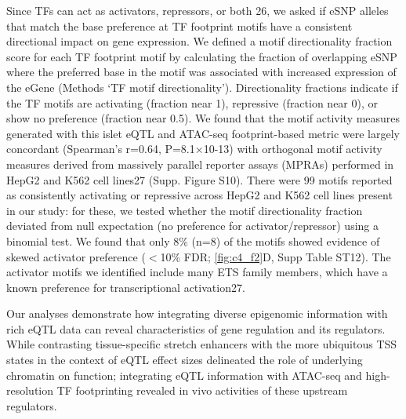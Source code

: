 Since TFs can act as activators, repressors, or both 26, we asked if eSNP alleles that match the base preference at TF footprint motifs have a consistent directional impact on gene expression. We defined a motif directionality fraction score for each TF footprint motif by calculating the fraction of overlapping eSNP where the preferred base in the motif was associated with increased expression of the eGene (Methods ‘TF motif directionality’). Directionality fractions indicate if the TF motifs are activating (fraction near 1), repressive (fraction near 0), or show no preference (fraction near 0.5). We found that the motif activity measures generated with this islet eQTL and ATAC-seq footprint-based metric were largely concordant (Spearman’s r=0.64, P=8.1×10-13) with orthogonal motif activity measures derived from massively parallel reporter assays (MPRAs) performed in HepG2 and K562 cell lines27 (Supp. Figure  S10). There were 99 motifs reported as consistently activating or repressive across HepG2 and K562 cell lines present in our study: for these, we tested whether the motif directionality fraction deviated from null expectation (no preference for activator/repressor) using a binomial test. We found that only 8\% (n=8) of the motifs showed evidence of skewed activator preference ($<$10\% FDR; \ref{fig:c4_f2}D, Supp Table ST12). The activator motifs we identified include many ETS family members, which have a known preference for transcriptional activation27. 

Our analyses demonstrate how integrating diverse epigenomic information with rich eQTL data can reveal characteristics of gene regulation and its regulators. While contrasting tissue-specific stretch enhancers with the more ubiquitous TSS states in the context of eQTL effect sizes delineated the role of underlying chromatin on function; integrating eQTL information with ATAC-seq and high-resolution TF footprinting revealed in vivo activities of these upstream regulators.  

